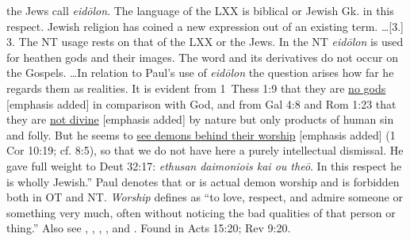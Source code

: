 the Jews call \emph{eidōlon}. The language of the LXX is biblical or Jewish Gk. in this respect. Jewish religion has coined a new expression out of an existing term. \ldots [3.] 3. The NT usage rests on that of the LXX or the Jews. In the NT \emph{eidōlon} is used for heathen gods and their images. The word and its derivatives do not occur on the Gospels. \ldots In relation to Paul's use of \emph{eidōlon} the question arises how far he regards them as realities. It is evident from 1~Thess 1:9 that they are \underline{no gods} [emphasis added] in comparison with God, and from Gal 4:8 and Rom 1:23 that they are \underline{not divine} [emphasis added] by nature but only products of human sin and folly. But he seems to \underline{see demons behind their worship} [emphasis added] (1 Cor 10:19; cf. 8:5), so that we do not have here a purely intellectual dismissal. He gave full weight to Deut 32:17: \emph{ethusan daimoniois kai ou theō}. In this respect he is wholly Jewish.''
 Paul denotes that  or  is actual demon worship and is forbidden both in OT and NT. \emph{Worship} defines as ``to love, respect, and admire someone or something very much, often without noticing the bad qualities of that person or thing.'' Also see , , , , and .
Found in Acts 15:20; Rev 9:20.
